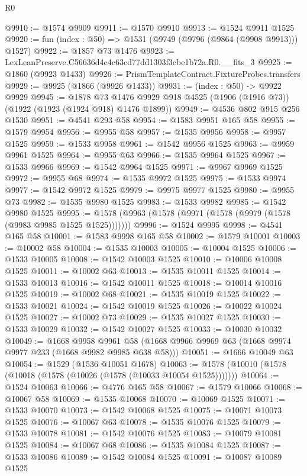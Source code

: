 \begin{lexlean}{R0}
\begin{coremodule}
@9910 := @1574 @9909
@9911 := @1570 @9910
@9913 := @1524 @9911 @1525
@9920 := fun (index : @50) => @1531 (@9749 (@9796 (@9864 (@9908 @9913))) @1527)
@9922 := @1857 @73 @1476
@9923 := LexLeanPreserve.C56636d4c4c63cd77dd1303f3cbe1b72a.R0.__fits_3
@9925 := @1860 (@9923 @1433)
@9926 := PrismTemplateContract.FixtureProbes.transfers
@9929 := @9925 (@1866 (@9926 @1433))
@9931 := (index : @50) -> @9922 @9929
@9945 := @1878
    @73
    @1476
    @9929
    @918
    @4525
    (@1906 (@1916 @73))
    (@1922 (@1923 (@1924 @918) @1476 @1899))
@9949 := @4536 @802 @915 @256 @1530
@9951 := @4541 @293 @58
@9954 := @1583 @9951 @165 @58
@9955 := @1579 @9954
@9956 := @9955 @58
@9957 := @1535 @9956
@9958 := @9957 @1525
@9959 := @1533 @9958
@9961 := @1542 @9956 @1525
@9963 := @9959 @9961 @1525
@9964 := @9955 @63
@9966 := @1535 @9964 @1525
@9967 := @1533 @9966
@9969 := @1542 @9964 @1525
@9971 := @9967 @9969 @1525
@9972 := @9955 @68
@9974 := @1535 @9972 @1525
@9975 := @1533 @9974
@9977 := @1542 @9972 @1525
@9979 := @9975 @9977 @1525
@9980 := @9955 @73
@9982 := @1535 @9980 @1525
@9983 := @1533 @9982
@9985 := @1542 @9980 @1525
@9995 := @1578 (@9963 (@1578 (@9971 (@1578 (@9979 (@1578 (@9983 @9985 @1525 @1525)))))))
@9996 := @1524 @9995
@9998 := @4541 @165 @58
@10001 := @1583 @9998 @165 @58
@10002 := @1579 @10001
@10003 := @10002 @58
@10004 := @1535 @10003
@10005 := @10004 @1525
@10006 := @1533 @10005
@10008 := @1542 @10003 @1525
@10010 := @10006 @10008 @1525
@10011 := @10002 @63
@10013 := @1535 @10011 @1525
@10014 := @1533 @10013
@10016 := @1542 @10011 @1525
@10018 := @10014 @10016 @1525
@10019 := @10002 @68
@10021 := @1535 @10019 @1525
@10022 := @1533 @10021
@10024 := @1542 @10019 @1525
@10026 := @10022 @10024 @1525
@10027 := @10002 @73
@10029 := @1535 @10027 @1525
@10030 := @1533 @10029
@10032 := @1542 @10027 @1525
@10033 := @10030 @10032
@10049 := @1668
    @9958
    @9961
    @58
    (@1668 @9966 @9969 @63 (@1668 @9974 @9977 @233 (@1668 @9982 @9985 @638 @58)))
@10051 := @1666 @10049 @63
@10054 := @1529 (@1536 @10051 @1678)
@10063 := @1578 (@10010 (@1578 (@10018 (@1578 (@10026 (@1578 (@10033 @10054 @1525)))))))
@10064 := @1524 @10063
@10066 := @4776 @165 @58
@10067 := @1579 @10066
@10068 := @10067 @58
@10069 := @1535 @10068
@10070 := @10069 @1525
@10071 := @1533 @10070
@10073 := @1542 @10068 @1525
@10075 := @10071 @10073 @1525
@10076 := @10067 @63
@10078 := @1535 @10076 @1525
@10079 := @1533 @10078
@10081 := @1542 @10076 @1525
@10083 := @10079 @10081 @1525
@10084 := @10067 @68
@10086 := @1535 @10084 @1525
@10087 := @1533 @10086
@10089 := @1542 @10084 @1525
@10091 := @10087 @10089 @1525

\end{coremodule}
\end{lexlean}
